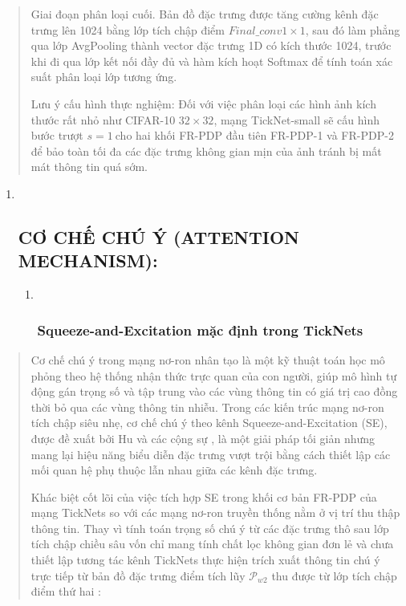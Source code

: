 \documentclass[
]{article}
\begin{document}
\begin{quote}
Giai đoạn phân loại cuối. Bản đồ đặc trưng được tăng cường kênh đặc
trưng lên 1024 bằng lớp tích chập điểm \(Final\_ conv1 \times 1\), sau
đó làm phẳng qua lớp AvgPooling thành vector đặc trưng 1D có kích thước
1024, trước khi đi qua lớp kết nối đầy đủ và hàm kích hoạt Softmax để
tính toán xác suất phân loại lớp tương ứng.

Lưu ý cấu hình thực nghiệm: Đối với việc phân loại các hình ảnh kích
thước rất nhỏ như CIFAR-10 \(32 \times 32\), mạng TickNet-small sẽ cấu
hình bước trượt \(s = 1\ \)cho hai khối FR-PDP đầu tiên FR-PDP-1 và
FR-PDP-2 để bảo toàn tối đa các đặc trưng không gian mịn của ảnh tránh
bị mất mát thông tin quá sớm.
\end{quote}

\begin{enumerate}
\def\labelenumi{\arabic{enumi}.}
\setcounter{enumi}{1}
\item ~
  \hypertarget{cux1a1-chux1ebf-chuxfa-uxfd-attention-mechanism}{%
  \subsection{CƠ CHẾ CHÚ Ý (ATTENTION
  MECHANISM):}\label{cux1a1-chux1ebf-chuxfa-uxfd-attention-mechanism}}

  \begin{enumerate}
  \def\labelenumii{\arabic{enumii}.}
  \item ~
    \hypertarget{squeeze-and-excitation-mux1eb7c-ux111ux1ecbnh-trong-ticknets}{%
    \subsubsection{Squeeze-and-Excitation mặc định trong
    TickNets}\label{squeeze-and-excitation-mux1eb7c-ux111ux1ecbnh-trong-ticknets}}
  \end{enumerate}
\end{enumerate}

\begin{quote}
Cơ chế chú ý trong mạng nơ-ron nhân tạo là một kỹ thuật toán học mô
phỏng theo hệ thống nhận thức trực quan của con người, giúp mô hình tự
động gán trọng số và tập trung vào các vùng thông tin có giá trị cao
đồng thời bỏ qua các vùng thông tin nhiễu. Trong các kiến trúc mạng
nơ-ron tích chập siêu nhẹ, cơ chế chú ý theo kênh Squeeze-and-Excitation
(SE), được đề xuất bởi Hu và các cộng sự , là một giải pháp tối giản
nhưng mang lại hiệu năng biểu diễn đặc trưng vượt trội bằng cách thiết
lập các mối quan hệ phụ thuộc lẫn nhau giữa các kênh đặc trưng.

Khác biệt cốt lõi của việc tích hợp SE trong khối cơ bản FR-PDP của mạng
TickNets so với các mạng nơ-ron truyền thống nằm ở vị trí thu thập thông
tin. Thay vì tính toán trọng số chú ý từ các đặc trưng thô sau lớp tích
chập chiều sâu vốn chỉ mang tính chất lọc không gian đơn lẻ và chưa
thiết lập tương tác kênh TickNets thực hiện trích xuất thông tin chú ý
trực tiếp từ bản đồ đặc trưng điểm tích lũy \(\mathcal{P}_{w2}\) thu
được từ lớp tích chập điểm thứ hai :
\end{quote}
\end{document}
